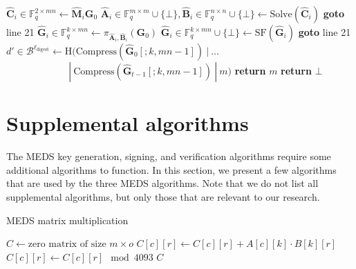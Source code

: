 \begin{algorithm}[H]
\begin{algorithmic}[1]
        \State $\hat{\textbf{C}}_i \in \mathds{F}_q^{2 \times mn} \gets \hat{\textbf{M}}_i \textbf{G}_0$
        \State $\hat{\textbf{A}}_i \in \mathds{F}_q^{m \times m} \cup \{\bot\}, \hat{\textbf{B}}_i \in \mathds{F}_q^{n \times n} \cup \{\bot\} \gets \text{Solve}(\hat{\textbf{C}}_i)$
            \State \textbf{goto} line 21
        \EndIf
        \State $\hat{\textbf{G}}_i \in \mathds{F}_q^{k \times mn} \gets \pi_{\hat{\textbf{A}}_i, \hat{\textbf{B}}_i}(\textbf{G}_0)$
        \State $\hat{\textbf{G}}_i \in \mathds{F}_q^{k \times mn} \cup \{\bot\} \gets \text{SF}(\hat{\textbf{G}}_i)$
            \State \textbf{goto} line 21
        \EndIf
    \EndIf
\EndFor
\State $d' \in \mathcal{B}^{\ell_\text{digest}} \gets \text{H}(\text{Compress}(\hat{\textbf{G}}_0[;k,mn-1])~|~\ldots$\\
$\quad\quad\quad\quad\quad\quad~~|~\text{Compress}(\hat{\textbf{G}}_{t-1}[;k,mn-1])~|~m)$
    \State \textbf{return} $m$
\Else
    \State \textbf{return} $\bot$
\EndIf
\end{algorithmic}
\end{algorithm}

\section{Supplemental algorithms}
\label{app:supplementalalgs}
The MEDS key generation, signing, and verification algorithms require some additional algorithms to function. In this section, we present a few algorithms that are used by the three MEDS algorithms. Note that we do not list all supplemental algorithms, but only those that are relevant to our research.

\begin{algorithm}
  \caption{MEDS matrix multiplication}
  \label{alg:medsmatrixmultiplication}
  \begin{algorithmic}
      \State $C \gets \text{zero matrix of size } m \times o$
            \State $C[c][r] \gets C[c][r] + A[c][k] \cdot B[k][r]$
          \EndFor
          \State $C[c][r] \gets C[c][r] \mod 4093$
        \EndFor
      \EndFor
      \State \Return $C$
    \EndFunction
  \end{algorithmic}
\end{algorithm}

